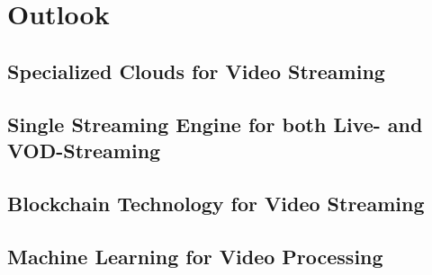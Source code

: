 
\chapter{Outlook}\label{chapter:outlook}

\section{Specialized Clouds for Video Streaming}
\section{Single Streaming Engine for both Live- and VOD-Streaming}
\section{Blockchain Technology for Video Streaming}
\section{Machine Learning for Video Processing}